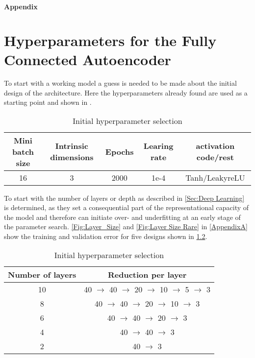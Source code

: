 

\begin{center}
	{\sffamily \bfseries\Large Appendix}\\
\end{center}%
\vspace{1cm}

\chapter{Hyperparameters for the Fully Connected Autoencoder}
\label{Ap: Fully Connected}


To start with a working model a guess is needed to be made about the initial design of the architecture. Here the hyperparameters already found are used as a starting point and shown in .\\
\begin{table}[!htbp]\centering
	\begin{tabular}{ |c|c|c|c|c| }
		\hline
		Mini batch size & Intrinsic dimensions& Epochs & Learing rate & activation code/rest\\ [.5ex]
		\hline
		16 & 3 & 2000& 1e-4 & Tanh/LeakyreLU\\ \hline
	\end{tabular}
	\caption{Initial hyperparameter selection}
	\label{Tab:First Guess}
\end{table}
To start with the number of layers or depth as described in \cref{Sec:Deep Learning} is determined, as they set a consequential part of the representational capacity of the model and therefore can initiate over- and underfitting at an early stage of the parameter search. \cref{Fig:Layer_Size} and \cref{Fig:Layer Size Rare} in \cref{AppendixA} show the training and validation error for five designs shown in \cref{Tab:Layer Size}.\\
\begin{table}[!htbp]\centering
	\begin{tabular}{ |c|c| }
		\hline
		Number of layers & Reduction per layer \\ [.5ex]
		\hline
		10 & 40 \(\rightarrow\) 40 \(\rightarrow\) 20  \(\rightarrow\) 10 \(\rightarrow\) 5 \(\rightarrow\) 3\\ \hline
		8 & 40 \(\rightarrow\) 40 \(\rightarrow\) 20  \(\rightarrow\) 10 \(\rightarrow\) 3\\ \hline
		6 & 40 \(\rightarrow\) 40 \(\rightarrow\) 20  \(\rightarrow\) 3\\ \hline
		4 & 40 \(\rightarrow\) 40 \(\rightarrow\) 3\\ \hline
		2 & 40 \(\rightarrow\) 3\\ \hline
	\end{tabular}
	\caption{Initial hyperparameter selection}
	\label{Tab:Layer Size}
\end{table}
